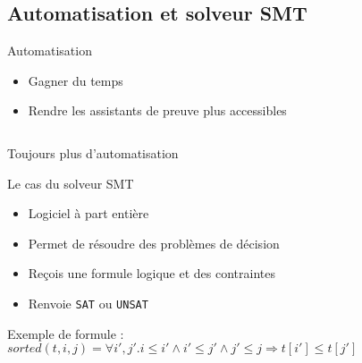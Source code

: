 \documentclass[french,usepdftitle=false,compress]{beamer}
\begin{document}
\subsection{Automatisation et solveur SMT}
\begin{frame}{Automatisation}
  \begin{exampleblock}{}
    \begin{itemize}
      \item Gagner du temps
      \item Rendre les assistants de preuve plus accessibles
    \end{itemize}
  \end{exampleblock}
  \vfill
  \pause
  \inputminted{coq}{basic_lia.v}
\end{frame}

\begin{frame}{Toujours plus d'automatisation}
  \begin{block}{Le cas du solveur SMT}
    \begin{itemize}
      \item Logiciel à part entière
      \item Permet de résoudre des problèmes de décision
      \item Reçois une formule logique et des contraintes
      \item Renvoie \texttt{SAT} ou \texttt{UNSAT}
    \end{itemize}
  \end{block}

  \begin{block}{Exemple de formule :}
    \begin{math}
      sorted(t,i,j) = \forall i',j'. i \leq i' \land i' \leq j' \land j' \leq j \Rightarrow t[i'] \leq t[j']
    \end{math}
  \end{block}
\end{frame}
\end{document}
